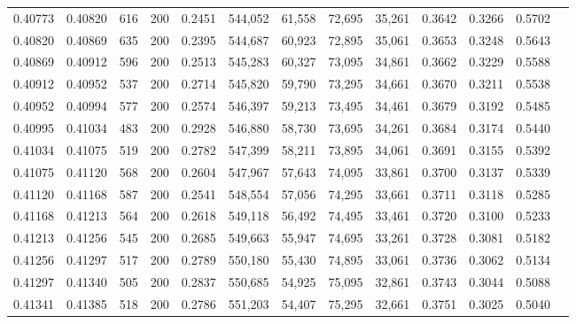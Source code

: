 \begin{tabular}{rrrrrrrrrrrrr}
0.40773 & 0.40820 &   616 & 200 &                                     0.2451 & 544,052 &  61,558 &  72,695 &  35,261 & 0.3642 & 0.3266 & 0.5702 \\
0.40820 & 0.40869 &   635 & 200 &                                     0.2395 & 544,687 &  60,923 &  72,895 &  35,061 & 0.3653 & 0.3248 & 0.5643 \\
0.40869 & 0.40912 &   596 & 200 &                                     0.2513 & 545,283 &  60,327 &  73,095 &  34,861 & 0.3662 & 0.3229 & 0.5588 \\
0.40912 & 0.40952 &   537 & 200 &                                     0.2714 & 545,820 &  59,790 &  73,295 &  34,661 & 0.3670 & 0.3211 & 0.5538 \\
0.40952 & 0.40994 &   577 & 200 &                                     0.2574 & 546,397 &  59,213 &  73,495 &  34,461 & 0.3679 & 0.3192 & 0.5485 \\
0.40995 & 0.41034 &   483 & 200 &                                     0.2928 & 546,880 &  58,730 &  73,695 &  34,261 & 0.3684 & 0.3174 & 0.5440 \\
0.41034 & 0.41075 &   519 & 200 &                                     0.2782 & 547,399 &  58,211 &  73,895 &  34,061 & 0.3691 & 0.3155 & 0.5392 \\
0.41075 & 0.41120 &   568 & 200 &                                     0.2604 & 547,967 &  57,643 &  74,095 &  33,861 & 0.3700 & 0.3137 & 0.5339 \\
0.41120 & 0.41168 &   587 & 200 &                                     0.2541 & 548,554 &  57,056 &  74,295 &  33,661 & 0.3711 & 0.3118 & 0.5285 \\
0.41168 & 0.41213 &   564 & 200 &                                     0.2618 & 549,118 &  56,492 &  74,495 &  33,461 & 0.3720 & 0.3100 & 0.5233 \\
0.41213 & 0.41256 &   545 & 200 &                                     0.2685 & 549,663 &  55,947 &  74,695 &  33,261 & 0.3728 & 0.3081 & 0.5182 \\
0.41256 & 0.41297 &   517 & 200 &                                     0.2789 & 550,180 &  55,430 &  74,895 &  33,061 & 0.3736 & 0.3062 & 0.5134 \\
0.41297 & 0.41340 &   505 & 200 &                                     0.2837 & 550,685 &  54,925 &  75,095 &  32,861 & 0.3743 & 0.3044 & 0.5088 \\
0.41341 & 0.41385 &   518 & 200 &                                     0.2786 & 551,203 &  54,407 &  75,295 &  32,661 & 0.3751 & 0.3025 & 0.5040 \\

\end{tabular}
